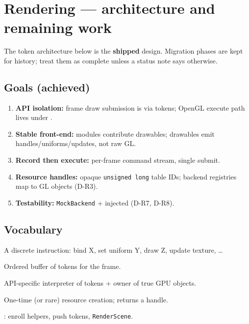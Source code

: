 \section{Rendering --- architecture and remaining work}
\label{sec:rendering-target}

The token architecture below is the \textbf{shipped} design. Migration phases
are kept for history; treat them as complete unless a status note says otherwise.

\subsection{Goals (achieved)}
\begin{enumerate}
  \item \textbf{API isolation:} frame draw submission is via tokens; OpenGL
        execute path lives under .
  \item \textbf{Stable front-end:} modules contribute drawables; drawables emit
        handles/uniforms/updates, not raw GL.
  \item \textbf{Record then execute:} per-frame command stream, single submit.
  \item \textbf{Resource handles:} opaque \texttt{unsigned long} table IDs;
        backend registries map to GL objects (D-R3).
  \item \textbf{Testability:} \texttt{MockBackend} + injected 
        (D-R7, D-R8).
\end{enumerate}

\subsection{Vocabulary}
\begin{description}[style=nextline]
  \item[Token / RenderCommand]
    A discrete instruction: bind X, set uniform Y, draw Z, update texture, \ldots
  \item[Command queue]
    Ordered buffer of tokens for the frame.
  \item[Backend]
    API-specific interpreter of tokens + owner of true GPU objects.
  \item[Enrollment]
    One-time (or rare) resource creation; returns a handle.
  \item[Front-end renderer]
    : enroll helpers, push tokens, \texttt{RenderScene}.
\end{description}

